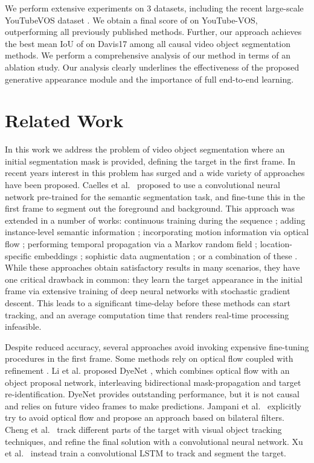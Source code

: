 \documentclass[10pt,twocolumn,letterpaper]{article}
\begin{document}
We perform extensive experiments on 3 datasets, including the recent large-scale YouTubeVOS dataset \cite{YTVOS}. We obtain a final score of  on YouTube-VOS, outperforming all previously published methods. Further, our approach achieves the best mean IoU of  on Davis17 among all causal video object segmentation methods. We perform a comprehensive analysis of our method in terms of an ablation study. Our analysis clearly underlines the effectiveness of the proposed generative appearance module and the importance of full end-to-end learning. 



 \section{Related Work}
In this work we address the problem of video object segmentation where an initial segmentation mask is provided, defining the target in the first frame. In recent years interest in this problem has surged and a wide variety of approaches have been proposed. Caelles et al.\ \cite{OSVOS} proposed to use a convolutional neural network pre-trained for the semantic segmentation task, and fine-tune this in the first frame to segment out the foreground and background. This approach was extended in a number of works: continuous training during the sequence \cite{OnAVOS}; adding instance-level semantic information \cite{OSVOS-S}; incorporating motion information via optical flow \cite{MGCRN,CINM,SFL}; performing temporal propagation via a Markov random field \cite{CINM}; location-specific embeddings \cite{LSE}; sophistic data augmentation \cite{LuT}; or a combination of these \cite{PReMVOS}. While these approaches obtain satisfactory results in many scenarios, they have one critical drawback in common: they learn the target appearance in the initial frame via extensive training of deep neural networks with stochastic gradient descent. This leads to a significant time-delay before these methods can start tracking, and an average computation time that renders real-time processing infeasible.

Despite reduced accuracy, several approaches avoid invoking expensive fine-tuning procedures in the first frame.  Some methods rely on optical flow coupled with refinement \cite{CTN,OFL}. Li et al. proposed DyeNet \cite{DyeNet}, which combines optical flow with an object proposal network, interleaving bidirectional mask-propagation and target re-identification. DyeNet provides outstanding performance, but it is not causal and relies on future video frames to make predictions. Jampani et al.\ \cite{VPN} explicitly try to avoid optical flow and propose an approach based on bilateral filters. Cheng et al.\ \cite{FAVOS} track different parts of the target with visual object tracking techniques, and refine the final solution with a convolutional neural network. Xu et al.\ \cite{YTVOS} instead train a convolutional LSTM \cite{hochreiter1997lstm} to track and segment the target.
\end{document}
